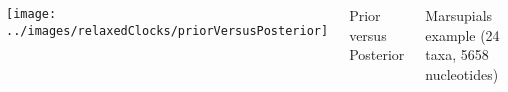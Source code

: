 \begin{frame}[plain]

\begin{columns}[t]


\texttt{[image: ../images/relaxedClocks/priorVersusPosterior]}


\Large{Prior versus Posterior}

\bigskip{}

\normalsize{Marsupials example (24 taxa, 5658 nucleotides)}

\end{columns}

\end{frame}
